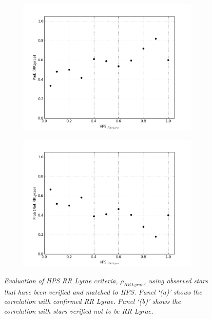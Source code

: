 \documentclass[aps,prb,twocolumn,superscriptaddress]{revtex4-1}
\begin{document}
\begin{figure}
	\centering
	\begin{subfigure}{.45\textwidth}
	  \centering
	  \includegraphics[width=1\linewidth]{figures/NEW/probrr_vs_HPS.png}
		\caption{\it \small{ }}
		\label{fig:probrrHPS}
	\end{subfigure}%
	\begin{subfigure}{.45\textwidth}
	  \centering
			\includegraphics[width=1\linewidth]{figures/NEW/probnotrr_vs_HPS.png}
		\caption{\it \small{ }}
		\label{fig:probnotrrHPS}
	\end{subfigure}
	\caption{\it \small{Evaluation of HPS RR Lyrae criteria, $\rho_{RRLyrae}$, using observed stars that have been verified and matched to HPS.  Panel `(a)' shows the correlation with confirmed RR Lyrae.  Panel `(b)' shows the correlation with stars verified not to be RR Lyrae.}}
	\label{fig:HPSprob}
\end{figure}
\end{document}
